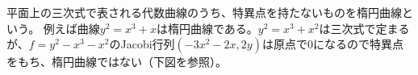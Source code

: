 \documentclass[uplatex,11pt,a4paper,dvipdfmx]{jsarticle}
\numberwithin{equation}{section}
\theoremstyle{definition}
\begin{document}



平面上の三次式で表される代数曲線のうち、特異点を持たないものを楕円曲線という。
例えば曲線$y^2 = x^3 + x$は楕円曲線である。$y^2 = x^3 + x^2$は三次式で定まるが、$f = y^2-x^3 - x^2$のJacobi行列$(-3x^2-2x, 2y)$は原点で$0$になるので特異点をもち、楕円曲線ではない（下図を参照）。

\end{document}

